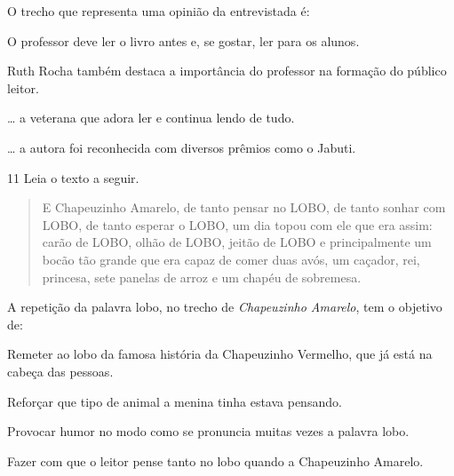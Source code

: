 \noindent O trecho que representa uma opinião da entrevistada é:

\begin{escolha}
\item O professor deve ler o livro antes e, se gostar, ler para os alunos.
\item Ruth Rocha também destaca a importância do professor na formação do
público leitor.
\item \ldots{} a veterana que adora ler e continua lendo de tudo.
\item \ldots{} a autora foi reconhecida com diversos prêmios como o Jabuti.
\end{escolha}



\num{11} Leia o texto a seguir.

\begin{quote}
\noindent E Chapeuzinho Amarelo, de tanto pensar no LOBO, de tanto sonhar com
LOBO, de tanto esperar o LOBO, um dia topou com ele que era assim: carão
de LOBO, olhão de LOBO, jeitão de LOBO e principalmente um bocão tão
grande que era capaz de comer duas avós, um caçador, rei, princesa, sete
panelas de arroz e um chapéu de sobremesa.

\end{quote}

\noindent A repetição da palavra lobo, no trecho de \emph{Chapeuzinho Amarelo}, tem o
objetivo de:

\begin{escolha}
\item Remeter ao lobo da famosa história da Chapeuzinho Vermelho, que já
está na cabeça das pessoas.
\item Reforçar que tipo de animal a menina tinha estava pensando.
\item Provocar humor no modo como se pronuncia muitas vezes a palavra lobo.
\item Fazer com que o leitor pense tanto no lobo quando a Chapeuzinho
Amarelo.
\end{escolha}

